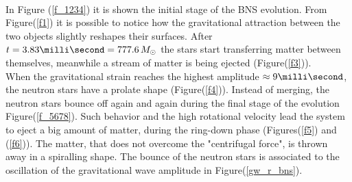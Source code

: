  \\
In Figure (\ref{f_1234}) it is shown the initial stage of the BNS evolution.
From Figure(\ref{f1}) it is possible to notice how the gravitational attraction between the two objects slightly reshapes their surfaces.
After $t = 3.83 \milli \second = 777.6 \, M _{\odot}$ the stars start transferring matter between themselves, meanwhile a stream of matter is being ejected (Figure(\ref{f3})).\\
When the gravitational strain reaches the highest amplitude $\approx 9 \milli \second$, the neutron stars have a prolate shape (Figure(\ref{f4})).
Instead of merging, the neutron stars bounce off again and again during the final stage of the evolution Figure(\ref{f_5678}).
Such behavior and the high rotational velocity lead the system to eject a big amount of matter, during the ring-down phase (Figures(\ref{f5}) and (\ref{f6})). 
The matter, that does not overcome the "centrifugal force", is thrown away in a spiralling shape.
The bounce of the neutron stars is associated to the oscillation of the gravitational wave amplitude in Figure(\ref{gw_r_bns}).
\\


